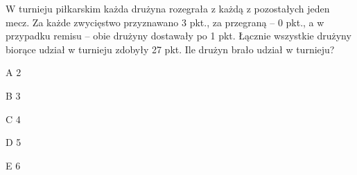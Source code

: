 \begin{tresc}
W turnieju piłkarskim każda drużyna rozegrała z każdą z pozostałych jeden mecz. Za każde zwycięstwo przyznawano 3 pkt., za przegraną – 0 pkt., a w przypadku remisu – obie drużyny dostawały po 1 pkt. Łącznie wszystkie drużyny biorące udział w turnieju zdobyły 27 pkt. Ile drużyn brało udział w turnieju?
\end{tresc}
\begin{wariant}{A} 2 \end{wariant}
\begin{wariant}{B} 3 \end{wariant}
\begin{wariant}{C} 4 \end{wariant}
\begin{wariant}{D} 5 \end{wariant}
\begin{wariant}{E} 6 \end{wariant}
